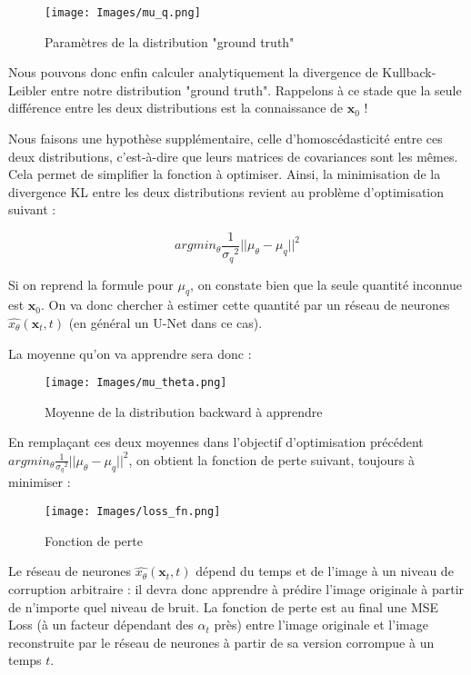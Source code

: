 \documentclass{article}
\begin{document}
\begin{figure}[H]
    \centering
    \texttt{[image: Images/mu\_q.png]}
    \caption{Paramètres de la distribution "ground truth"}
\end{figure}

Nous pouvons donc enfin calculer analytiquement la divergence de Kullback-Leibler entre notre distribution "ground truth". Rappelons à ce stade que la seule différence entre les deux distributions est la connaissance de $\textbf{x}_0$ !

Nous faisons une hypothèse supplémentaire, celle d'homoscédasticité entre ces deux distributions, c'est-à-dire que leurs matrices de covariances sont les mêmes. Cela permet de simplifier la fonction à optimiser. Ainsi, la minimisation de la divergence KL entre les deux distributions revient au problème d'optimisation suivant :

$$ arg min_{\theta}  \frac{1}{{\sigma_q}^2} {||\mu_\theta - \mu_q||}^2 $$

Si on reprend la formule pour $\mu_q$, on constate bien que la seule quantité inconnue est $\textbf{x}_0$. On va donc chercher à estimer cette quantité par un réseau de neurones $\hat{x_\theta}(\textbf{x}_t,t)$ (en général un U-Net dans ce cas). 

La moyenne qu'on va apprendre sera donc :

\begin{figure}[H]
    \centering
    \texttt{[image: Images/mu\_theta.png]}
    \caption{Moyenne de la distribution backward à apprendre}
\end{figure}

En remplaçant ces deux moyennes dans l'objectif d'optimisation précédent $ arg min_{\theta}  \frac{1}{{\sigma_q}^2} {||\mu_\theta - \mu_q||}^2 $, on obtient la fonction de perte suivant, toujours à minimiser :

\begin{figure}[H]
    \centering
    \texttt{[image: Images/loss\_fn.png]}
    \caption{Fonction de perte}
\end{figure}

Le réseau de neurones $\hat{x_\theta}(\textbf{x}_t,t)$ dépend du temps et de l'image à un niveau de corruption arbitraire : il devra donc apprendre à prédire l'image originale à partir de n'importe quel niveau de bruit. La fonction de perte est au final une MSE Loss (à un facteur dépendant des $\alpha_t$ près) entre l'image originale et l'image reconstruite par le réseau de neurones à partir de sa version corrompue à un temps $t$.
\end{document}

